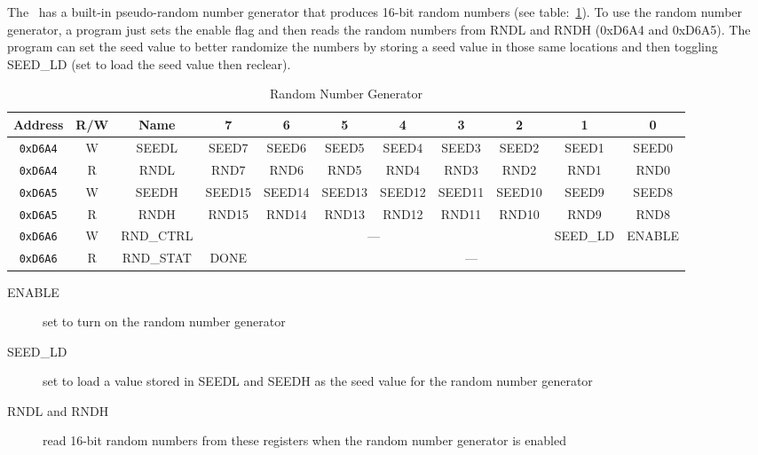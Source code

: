 The \jr\ has a built-in pseudo-random number generator that produces 16-bit random numbers (see table:~\ref{tab:rng_reg}). To use the random number generator, a program just sets the enable flag and then reads the random numbers from RNDL and RNDH (0xD6A4 and 0xD6A5). The program can set the seed value to better randomize the numbers by storing a seed value in those same locations and then toggling SEED\_LD (set to load the seed value then reclear).

\begin{table}[ht]
    \begin{center}
        \begin{tabular}{|c|c|c|c|c|c|c|c|c|c|c|} \hline
            Address & R/W & Name & 7 & 6 & 5 & 4 & 3 & 2 & 1 & 0 \\\hline\hline
            \verb+0xD6A4+ & W & SEEDL & SEED7 & SEED6 & SEED5 & SEED4 & SEED3 & SEED2 & SEED1 & SEED0 \\ \hline
            \verb+0xD6A4+ & R & RNDL & RND7 & RND6 & RND5 & RND4 & RND3 & RND2 & RND1 & RND0 \\ \hline
            \verb+0xD6A5+ & W & SEEDH & SEED15 & SEED14 & SEED13 & SEED12 & SEED11 & SEED10 & SEED9 & SEED8 \\ \hline
            \verb+0xD6A5+ & R & RNDH & RND15 & RND14 & RND13 & RND12 & RND11 & RND10 & RND9 & RND8 \\ \hline

            \verb+0xD6A6+ & W & RND\_CTRL & \multicolumn{6}{|c|}{---} & SEED\_LD & ENABLE \\ \hline
            \verb+0xD6A6+ & R & RND\_STAT & DONE & \multicolumn{7}{|c|}{---} \\ \hline

        \end{tabular}
    \end{center}
    \caption{Random Number Generator}
    \label{tab:rng_reg}
\end{table}

\begin{description}
    \item[ENABLE] set to turn on the random number generator

    \item[SEED\_LD] set to load a value stored in SEEDL and SEEDH as the seed value for the random number generator

    \item[RNDL and RNDH] read 16-bit random numbers from these registers when the random number generator is enabled
\end{description}

